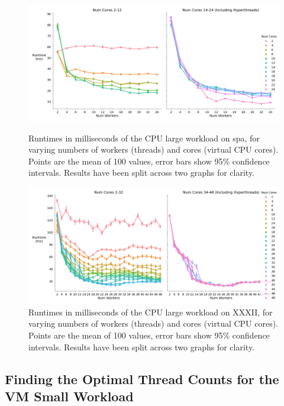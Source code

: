 \begin{figure}[H]
    \vspace*{-2.5cm}
    \centerline{\includegraphics[width=1.5\textwidth]{graphics/optimal_threads/spa/optimal_threads_cpu_large.png}}
    \caption{Runtimes in milliseconds of the CPU large workload on spa, for varying numbers of workers (threads) and cores (virtual CPU cores). Points are the mean of 100 values, error bars show 95\% confidence intervals. Results have been split across two graphs for clarity.}
    \label{fig:opt_spa_cpu_large}
    
    \centerline{\includegraphics[width=1.5\textwidth]{graphics/optimal_threads/XXXII/optimal_threads_cpu_large.png}}
    \caption{Runtimes in milliseconds of the CPU large workload on XXXII, for varying numbers of workers (threads) and cores (virtual CPU cores). Points are the mean of 100 values, error bars show 95\% confidence intervals. Results have been split across two graphs for clarity.}
    \label{fig:opt_xxxii_cpu_large}
\end{figure}



\subsection{Finding the Optimal Thread Counts for the VM Small Workload}
\label{section:results:finding_the_optimal_thread_couonts_for_the_vm_small_workload}

